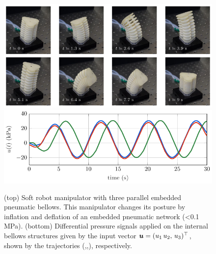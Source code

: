 \begin{figure}[!h]
  \centering
  \includegraphics*[width=\textwidth]{./pdf/thesis-figure-4-1-1.pdf} \\[1.25em]
  \includegraphics*[width=\textwidth]{./pdf/thesis-figure-4-1-2.pdf}
   \caption{(top) Soft robot manipulator with three parallel embedded pneumatic bellows. This manipulator changes its posture by inflation and deflation of an embedded pneumatic network (<0.1 \si{\mega \pascal}). (bottom) Differential pressure signals applied on the internal bellows structures given by the input vector ${\boldsymbol{u}} = (u_1\,u_2,\,u_3)^\top$, shown by the trajectories (,,), respectively.}
   \vspace{-0.1cm}
   \label{fig:C2:soft_robot}
 \end{figure}
 
